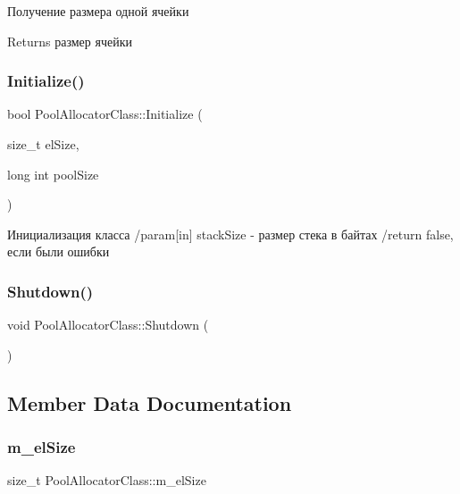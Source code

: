 Получение размера одной ячейки 

\begin{DoxyReturn}{Returns}
размер ячейки 
\end{DoxyReturn}
\mbox{\label{class_pool_allocator_class_a3f6694a151198bc92133716332cd1779}} 
\subsubsection{\texorpdfstring{Initialize()}{Initialize()}}
{\footnotesize\ttfamily bool Pool\+Allocator\+Class\+::\+Initialize (\begin{DoxyParamCaption}\item[{size\+\_\+t}]{el\+Size,  }\item[{long int}]{pool\+Size }\end{DoxyParamCaption})}

Инициализация класса /param\mbox{[}in\mbox{]} stack\+Size -\/ размер стека в байтах /return false, если были ошибки \mbox{\label{class_pool_allocator_class_a98aa06cbb355a7cdeff4f18bc32e3532}} 
\subsubsection{\texorpdfstring{Shutdown()}{Shutdown()}}
{\footnotesize\ttfamily void Pool\+Allocator\+Class\+::\+Shutdown (\begin{DoxyParamCaption}{ }\end{DoxyParamCaption})}



\subsection{Member Data Documentation}
\mbox{\label{class_pool_allocator_class_aa642f9cb3e6759f2acd714d9a749293b}} 
\subsubsection{\texorpdfstring{m\+\_\+el\+Size}{m\_elSize}}
{\footnotesize\ttfamily size\+\_\+t Pool\+Allocator\+Class\+::m\+\_\+el\+Size\hspace{0.3cm}{\ttfamily [private]}}



